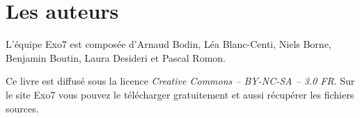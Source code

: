 
\clearemptydoublepage
\pagestyle{empty}\thispagestyle{empty}

\vspace*{\fill}

\section*{Les auteurs}


\medskip

L'équipe Exo7 est composée d'Arnaud Bodin, Léa Blanc-Centi, Niels Borne, 
Benjamin Boutin, Laura Desideri et Pascal Romon.


Ce livre est diffusé sous la licence \emph{Creative Commons -- BY-NC-SA -- 3.0 FR}.
Sur le site Exo7 vous pouvez le télécharger gratuitement et 
aussi récupérer les fichiers sources.
\vspace*{\fill}



\printindex
{}

